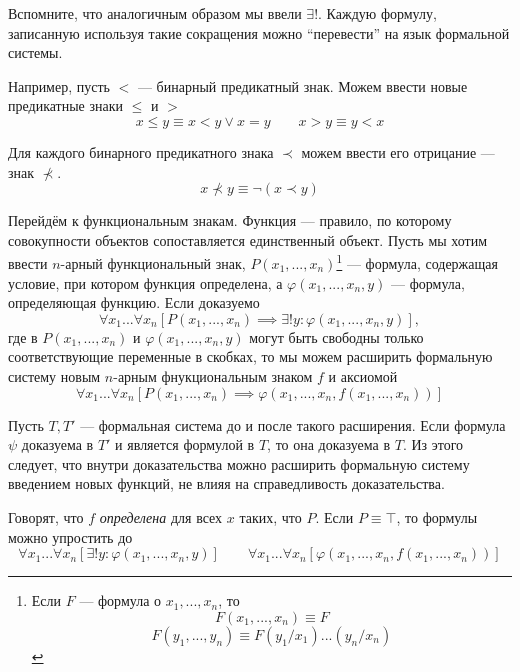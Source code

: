 Вспомните, что аналогичным образом мы ввели $\exists!$. Каждую формулу,
записанную используя такие сокращения можно
``перевести'' на язык формальной системы.

Например, пусть $<$ --- бинарный предикатный знак.
Можем ввести новые предикатные знаки $\leq$ и $>$
\[
	x\leq y\equiv x<y\lor x=y\qquad x>y\equiv y< x
\]

Для каждого бинарного предикатного знака $\prec$ можем
ввести его отрицание --- знак $\nprec$.
\[
	x\nprec y\equiv \lnot(x\prec y)
\]

Перейдём к функциональным знакам. Функция --- правило, по которому совокупности
объектов сопоставляется единственный объект. Пусть мы хотим ввести $n$-арный
функциональный знак, $P(x_1,...,x_{n})$\footnote{
	Если $F$ --- формула о $x_1,...,x_{n}$, то
	\[
		F(x_1,...,x_{n})\equiv F
	\]
	\[F(y_1,...,y_{n})\equiv F(y_1/x_1)...(y_{n}/x_{n})\]}
--- формула, содержащая
условие, при котором функция определена, а $\varphi(x_1,...,x_{n},y)$ ---
формула, определяющая функцию. Если доказуемо
\[
	\forall x_1...\forall x_n[P(x_1,...,x_{n})
	\implies \exists! y:\varphi(x_1,...,x_{n},y)],
\]
где в $P(x_1,...,x_{n})$ и $\varphi(x_1,...,x_{n},y)$
могут быть свободны только
соответствующие переменные в скобках,
то мы можем расширить формальную систему новым $n$-арным фнукциональным знаком $f$
и аксиомой
\[
	\forall x_1...\forall x_{n}[P(x_1,...,x_{n})
	\implies \varphi(x_1,...,x_{n},f(x_1,...,x_{n}))]
\]

Пусть $T,T'$ --- формальная система до и после такого расширения.
Если формула $\psi$ доказуема в $T'$ и является формулой в $T$, то она доказуема в $T$.
Из этого следует, что внутри доказательства можно расширить формальную систему
введением новых функций, не влияя на справедливость доказательства.

Говорят, что $f$ {\it определена} для всех $x$ таких, что $P$.
Если $P\equiv \top$, то формулы можно упростить до
\[
	\forall x_1...\forall x_{n}[\exists !y:\varphi(x_1,...,x_{n},y)]\qquad
	\forall x_1...\forall x_{n}[\varphi(x_1,...,x_{n},f(x_1,...,x_{n}))]
\]

